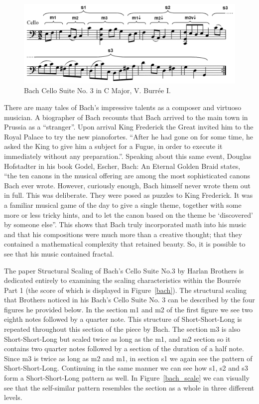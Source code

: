 \documentclass{article}
\begin{document}
\begin{figure}[ht!]
    \centering
    \includegraphics[width=\linewidth]{figures/bach_cello.png}
    \caption{%
        Bach Cello Suite No. 3 in C Major, V. Burrée I.
    }\label{fig:bach}
\end{figure}

There are many tales of Bach's impressive talents as a composer and virtuoso
musician. A biographer of Bach recounts that Bach arrived to the main  town in
Prussia as a “stranger”. Upon arrival King Frederick the Great invited him to
the Royal Palace to try the new pianofortes. ``After he had gone on for some
time, he asked the King to give him a subject for a Fugue, in order to execute
it immediately without any preparation.''\cite{6}. Speaking about this same event,
Douglas Hofstadter in his book Godel, Escher, Bach: An Eternal Golden Braid
states, ``the ten canons in the musical offering are among the most sophisticated
canons Bach ever wrote. However, curiously enough, Bach himself never wrote them
out in full. This was deliberate. They were posed as puzzles to King Frederick.
It was a familiar musical game of the day to give a single theme, together with
some more or less tricky hints, and to let the canon based on the theme be
`discovered' by someone else''\cite{7}. This shows that Bach truly incorporated math
into his music and that his compositions were much more than a creative thought;
that they contained a mathematical complexity that retained beauty. So, it is
possible to see that his music contained fractal.

The paper Structural Scaling of Bach’s Cello Suite No.3 by Harlan Brothers is
dedicated entirely to examining the scaling characteristics within the Bourrée
Part 1 (the score of which is displayed in Figure~\ref{bach}). The structural
scaling that Brothers noticed in his Bach’s Cello Suite No. 3 can be described
by the four figures he provided below. In the section m1 and m2 of the first
figure we see two eighth notes followed by a
quarter note. This structure of Short-Short-Long is repeated throughout this
section of the piece by Bach. The section m3 is also Short-Short-Long but scaled
twice as long as the m1, and m2 section so it contains two quarter notes
followed by a section of the duration of a half note. Since m3 is twice as long
as m2 and m1, in section s1 we again see the pattern of Short-Short-Long.
Continuing in the same manner we can see how s1, s2 and s3 form a
Short-Short-Long pattern as well. In Figure~\ref{bach_scale} we can visually see
that the self-similar pattern resembles the section as a whole in three
different levels.
\end{document}
